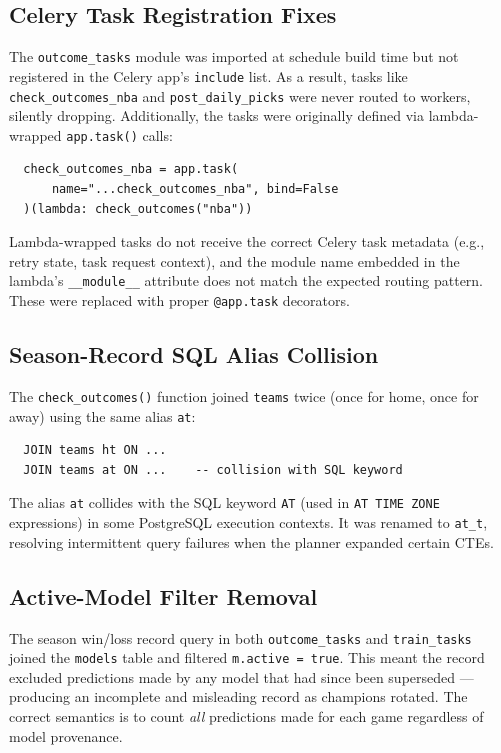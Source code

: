 \documentclass[conference]{IEEEtran}
\begin{document}
\subsection{Celery Task Registration Fixes}

The \texttt{outcome\_tasks} module was imported at schedule build time
but not registered in the Celery app's \texttt{include} list.
As a result, tasks like \texttt{check\_outcomes\_nba} and
\texttt{post\_daily\_picks} were never routed to workers, silently
dropping.  Additionally, the tasks were originally defined via
lambda-wrapped \texttt{app.task()} calls:
\begin{verbatim}
  check_outcomes_nba = app.task(
      name="...check_outcomes_nba", bind=False
  )(lambda: check_outcomes("nba"))
\end{verbatim}
Lambda-wrapped tasks do not receive the correct Celery task metadata
(e.g., retry state, task request context), and the module name embedded
in the lambda's \texttt{\_\_module\_\_} attribute does not match the
expected routing pattern.  These were replaced with proper
\texttt{@app.task} decorators.

\subsection{Season-Record SQL Alias Collision}

The \texttt{check\_outcomes()} function joined \texttt{teams} twice
(once for home, once for away) using the same alias \texttt{at}:
\begin{verbatim}
  JOIN teams ht ON ...
  JOIN teams at ON ...    -- collision with SQL keyword
\end{verbatim}
The alias \texttt{at} collides with the SQL keyword \texttt{AT}
(used in \texttt{AT TIME ZONE} expressions) in some PostgreSQL
execution contexts.  It was renamed to \texttt{at\_t}, resolving
intermittent query failures when the planner expanded certain CTEs.

\subsection{Active-Model Filter Removal}

The season win/loss record query in both \texttt{outcome\_tasks} and
\texttt{train\_tasks} joined the \texttt{models} table and filtered
\texttt{m.active = true}.  This meant the record excluded
predictions made by any model that had since been superseded —
producing an incomplete and misleading record as champions rotated.
The correct semantics is to count \emph{all} predictions made for
each game regardless of model provenance.
\end{document}
